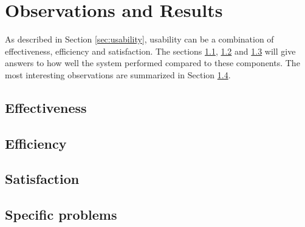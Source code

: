 \section{Observations and Results}

As described in Section \ref{sec:usability}, usability can be a combination of effectiveness, efficiency and satisfaction. The sections \ref{subsec:effectiveness}, \ref{subsec:efficiency} and \ref{subsec:satisfaction} will give answers to how well the system performed compared to these components. The most interesting observations are summarized in Section \ref{subsec:specificproblems}.

\subsection{Effectiveness}
\label{subsec:effectiveness}


\subsection{Efficiency}
\label{subsec:efficiency}


\subsection{Satisfaction}
\label{subsec:satisfaction}


\subsection{Specific problems}
\label{subsec:specificproblems}
